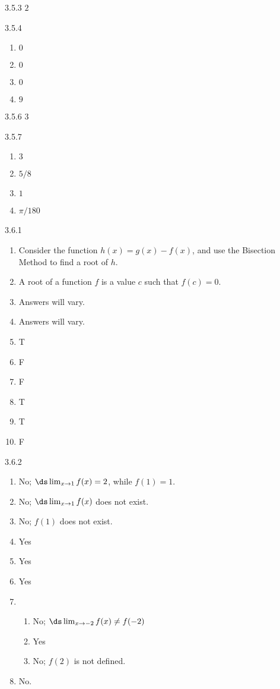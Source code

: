 \begin{Answer}{3.5.3}
 $2$
\end{Answer}
\begin{Answer}{3.5.4}
\begin{enumerate}
\item {$0$}
\item {$0$}
\item {$0$}
\item {$9$}
\end{enumerate}
\end{Answer}
\begin{Answer}{3.5.6}
	$ 3 $
\end{Answer}
\begin{Answer}{3.5.7}
\begin{enumerate}
\item {$3$}
\item {$5/8$}
\item {$1$}
\item {$\pi/180$}
\end{enumerate}
\end{Answer}
\begin{Answer}{3.6.1}
\begin{enumerate}
\item {Consider the function $h(x) = g(x) - f(x)$, and use the Bisection Method to find a root of $h$.}
\item {A root of a function $f$ is a value $c$ such that $f(c)=0$.}
\item {Answers will vary.}

\item {Answers will vary.}
\item {T}
\item {F}
\item {F}
\item {T}
\item {T}
\item {F}
\end{enumerate}
\end{Answer}
\begin{Answer}{3.6.2}
\begin{enumerate}
\item {No; $\ds \lim_{x\to 1} f(x) = 2$, while $f(1) = 1$.}
\item {No; $\ds \lim_{x\to 1} f(x)$ does not exist.}
\item {No; $f(1)$ does not exist.}
\item {Yes}
\item {Yes}
\item {Yes}
\item {\begin{enumerate}
\item		No; $\ds \lim_{x\to -2}f(x) \neq f(-2)$
\item		Yes
\item		No; $f(2)$ is not defined.
\end{enumerate}
}
\item No.
\end{enumerate}
\end{Answer}
